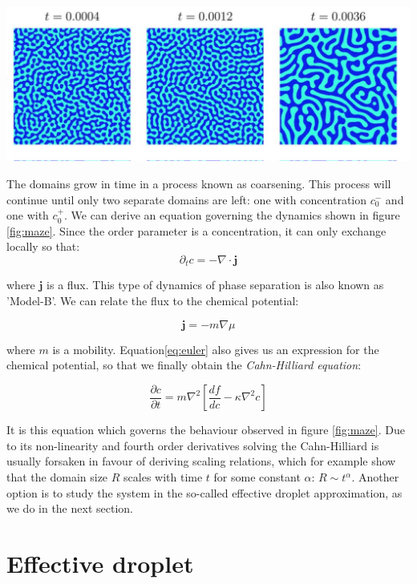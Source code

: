 \documentclass{Dissertate}
\let\origfigure\figure
\let\endorigfigure\endfigure
\renewenvironment{figure}[1][2] {
    \expandafter\origfigure\expandafter[H]
} {
    \endorigfigure
}
\begin{document}
\begin{figure}
\hypertarget{fig:maze}{%
\centering
\includegraphics{source/figures/png/CahnHilliard.png}
\caption{Cahn hilliard domains}\label{fig:maze}
}
\end{figure}

The domains grow in time in a process known as coarsening. This process will continue until only two separate domains are left: one with concentration $c_0^-$ and one with $c_0^+$. We can derive an equation governing the dynamics shown in figure \ref{fig:maze}. Since the order parameter is a concentration, it can only exchange locally so that: 
\[
\partial_t c = -\nabla \cdot \mathbf{j}
\]

where \(\mathbf{j}\) is a flux. This type of dynamics of phase separation is also known as 'Model-B'. We can relate the flux to the chemical
potential:

\[
\mathbf{j} = -m \nabla \mu
\]

where \(m\) is a mobility. Equation\ref{eq:euler} also gives us an expression for the chemical potential, so that we finally obtain the \emph{Cahn-Hilliard equation}:

\[
\frac{\partial c}{\partial t}=m\nabla^2[\frac{df}{dc}-\kappa\nabla^2c]
\]

It is this equation which governs the behaviour observed in figure
\ref{fig:maze}. Due to its non-linearity and fourth order
derivatives solving the Cahn-Hilliard is usually forsaken in
favour of deriving scaling relations, which for example show that the domain size $R$ scales with time $t$ for some constant $\alpha$: $R \sim t^{\alpha}$. Another option is to study the system in the so-called effective droplet approximation, as we do in the next section.

\hypertarget{effective-droplet}{%
\section{Effective droplet}\label{effective-droplet}}
\end{document}

